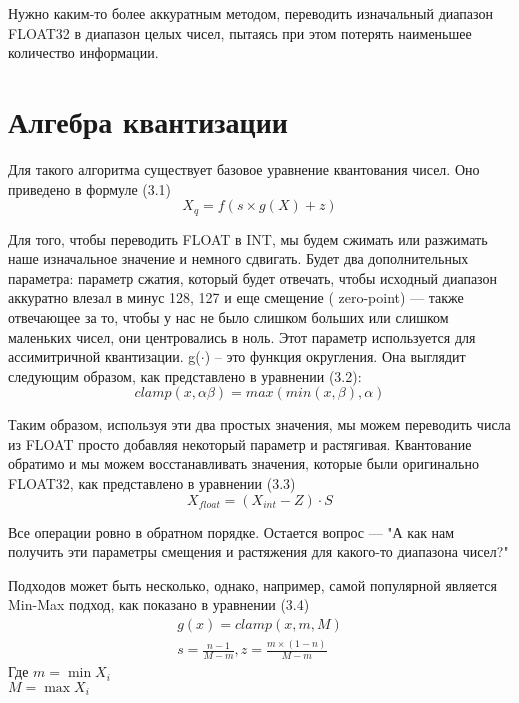 \documentclass[oneside,final,12pt]{extreport}
\begin{document}
Нужно каким-то более аккуратным методом, переводить изначальный диапазон FLOAT32 в диапазон целых чисел, пытаясь при этом потерять наименьшее количество информации. 

\section{Алгебра квантизации}
Для такого алгоритма существует базовое уравнение квантования чисел. Оно приведено в формуле (3.1)
\begin{equation}
X_q=f(s \times  g(X)+z)    
\end{equation}

Для того, чтобы переводить FLOAT в INT, мы будем сжимать или разжимать наше изначальное значение и немного сдвигать.  Будет два дополнительных параметра: параметр сжатия, который будет отвечать, чтобы исходный диапазон аккуратно влезал в минус 128, 
127 и еще смещение ( zero-point) — также отвечающее за то, чтобы у нас не было слишком больших или слишком маленьких чисел, они центровались в ноль. Этот параметр используется для ассимитричной квантизации.
g($\cdot$) – это функция округления. Она выглядит следующим образом, как представлено в уравнении (3.2):
\begin{equation}
clamp(x, \alpha \beta )=max(min(x,\beta), \alpha)
\end{equation}

Таким образом, используя эти два простых значения, мы можем переводить числа из FLOAT просто добавляя некоторый параметр и растягивая. Квантование обратимо и мы можем восстанавливать значения, которые были оригинально FLOAT32, как представлено в уравнении (3.3) 
\begin{equation}
X_{float}=(X_{int}-Z)\cdot S
\end{equation}

Все операции ровно в обратном порядке. Остается вопрос — "А как нам получить эти параметры смещения и растяжения для какого-то диапазона чисел?" 

Подходов может быть несколько, однако, например, самой популярной является Min-Max подход, как показано в уравнении (3.4)
\begin{equation}
\begin{split}
g(x)=clamp(x,m,M)\\
s=\frac{n-1}{M-m}, z=\frac{m\times (1-n)}{M-m}
\end{split}
\end{equation}
Где $m=\min{X_i}$\\ 
$M=\max{X_i}$
\end{document}
